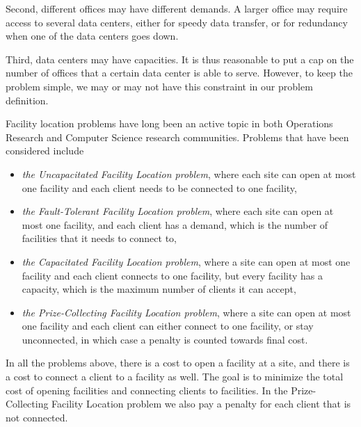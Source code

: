 \documentclass[oneside,final]{ucr}
\begin{document}
Second, different offices may have different demands. A
larger office may require access to several data centers,
either for speedy data transfer, or for redundancy when one
of the data centers goes down.

Third, data centers may have capacities. It is thus
reasonable to put a cap on the number of offices that a
certain data center is able to serve. However, to keep the
problem simple, we may or may not have this constraint in
our problem definition.

Facility location problems have long been an active topic in
both Operations Research and Computer Science research
communities. Problems that have been considered include
\begin{itemize}
\item \emph{the Uncapacitated Facility Location problem}, where
  each site can open at most one facility and each client
  needs to be connected to one facility,
\item \emph{the Fault-Tolerant Facility Location problem},
  where each site can open at most one facility, and each
  client has a demand, which is the number of facilities
  that it needs to connect to,
\item \emph{the Capacitated Facility Location problem},
  where a site can open at most one facility and each client
  connects to one facility, but every facility has a
  capacity, which is the maximum number of clients it can
  accept,
\item \emph{the Prize-Collecting Facility Location problem},
  where a site can open at most one facility and each client
  can either connect to one facility, or stay unconnected,
  in which case a penalty is counted towards final cost.
\end{itemize}
In all the problems above, there is a cost to open a
facility at a site, and there is a cost to connect a client
to a facility as well. The goal is to minimize the total
cost of opening facilities and connecting clients to
facilities. In the Prize-Collecting Facility Location
problem we also pay a penalty for each client that is not
connected.
\end{document}
